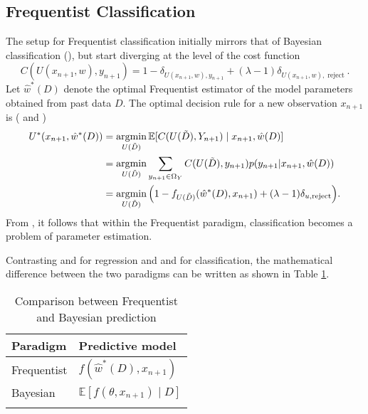 \subsection{Frequentist Classification}
\label{chp:frequentist_classification}
The setup for Frequentist classification initially mirrors that of Bayesian classification (), but start diverging at the level of the cost function
\begin{equation}
	C(U(x_{n+1},w), y_{n+1}) = 1 - \delta_{U(x_{n+1},w),y_{n+1}} + (\lambda-1)\delta_{U(x_{n+1},w), \operatorname{reject}}.
\end{equation}
Let $\hat{w}^*(D)$ denote the optimal Frequentist estimator of the model parameters obtained from past data $D$. The optimal decision rule for a new observation $x_{n+1}$ is ( and )
\begin{equation}
	\begin{split}
		U^*(x_{n+1}, \hat{w}^*(D)) &= \operatorname*{argmin}_{U(\tilde{D})} \mathbb{E}[C(U(\tilde{D}), Y_{n+1}) \mid x_{n+1}, \hat{w}(D)] \\
		&= \operatorname*{argmin}_{U(\tilde{D})} \sum_{y_{n+1}\in \Omega_Y}C(U(\tilde{D}),y_{n+1})p(y_{n+1}|x_{n+1}, \hat{w}(D)) \\
		&= \operatorname*{argmin}_{U(\tilde{D})} \Big(1 - f_{U(\tilde{D})}(\hat{w}^*(D), x_{n+1}) + (\lambda-1)\delta_{u, \operatorname{reject}}\Big).
	\end{split}
	\label{freq:decision_classification}
\end{equation}
From , it follows that within the Frequentist paradigm, classification becomes a problem of parameter estimation.

\begin{remark}
	Contrasting  and  for regression and  and  for classification, the mathematical difference between the two paradigms can be written as shown in Table \ref{tab:comare}.
	\begin{table}[h!]
		\centering
		\caption{Comparison between Frequentist and Bayesian prediction}
		\begin{tabular}{ll}
			\toprule
			\textbf{Paradigm} & \textbf{Predictive model} \\
			\midrule
			Frequentist & $f(\hat{w}^*(D), x_{n+1})$ \\[3pt]
			Bayesian    & $\mathbb{E}[f(\theta, x_{n+1}) \mid D]$ \\[3pt]
			\bottomrule
			\label{tab:comare}
		\end{tabular}
	\end{table}
\end{remark}

